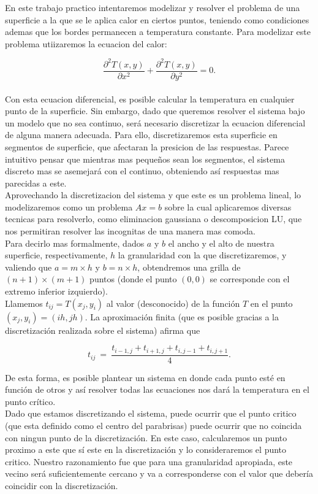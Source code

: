 En este trabajo practico intentaremos modelizar y resolver el problema de una superficie a la que se le aplica calor en ciertos puntos, teniendo como condiciones ademas que los bordes permanecen a temperatura constante. Para modelizar este problema utiizaremos la ecuacion del calor:

\begin{equation}
\frac{\partial^2T(x,y)}{\partial x^{2}}+\frac{\partial^2 T(x,y)}{\partial y^{2}} = 0.
\end{equation}\\

Con esta ecuacion diferencial, es posible calcular la temperatura en cualquier punto de la superficie. Sin embargo, dado que queremos resolver el sistema bajo un modelo que no sea continuo, ser\'a necesario discretizar la ecuacion diferencial de alguna manera adecuada. Para ello, discretizaremos esta superficie en segmentos de superficie, que afectaran la presicion de las respuestas. Parece intuitivo pensar que mientras mas pequeños sean los segmentos, el sistema discreto mas se asemejar\'a con el continuo, obteniendo as\'i respuestas mas parecidas a este.
\\
Aprovechando la discretizacion del sistema y que este es un problema lineal, lo modelizaremos como un problema $Ax=b$ sobre la cual aplicaremos diversas tecnicas para resolverlo, como eliminacion gaussiana o descomposicion LU, que nos permitiran resolver las incognitas de una manera mas comoda.
\\
Para decirlo mas formalmente, dados $a$ y $b$ el ancho y el alto de nuestra superficie, respectivamente, $h$ la granularidad con la que discretizaremos, y valiendo que  $a = m\times h$ y $b = n \times h$, obtendremos una grilla de $(n+1)\times(m+1)$ puntos (donde el punto $(0,0)$ se corresponde con el extremo inferior izquierdo).
\\
Llamemos $t_{ij} = T(x_j,y_i)$ al valor (desconocido) de la funci\'on $T$ en el punto $(x_j, y_i) = (ih, jh)$. La aproximaci\'on finita (que es posible gracias a la discretizaci\'on realizada sobre el sistema) afirma que

\begin{equation}
t_{ij} \ =\ \frac{ t_{i-1,j} + t_{i+1,j} + t_{i,j-1} + t_{i,j+1}}{4}.
\end{equation}

De esta forma, es posible plantear un sistema en donde cada punto est\'e en funci\'on de otros y as\'i resolver todas las ecuaciones nos dar\'a la temperatura en el punto cr\'itico.
\\
Dado que estamos discretizando el sistema, puede ocurrir que el punto critico (que esta definido como el centro del parabrisas) puede ocurrir que no coincida con ningun punto de la discretización. En este caso, calcularemos un punto proximo a este que sí este en la discretización y lo consideraremos el punto critico. Nuestro razonamiento fue que para una granularidad apropiada, este vecino será suficientemente cercano y va a corresponderse con el valor que debería coincidir con la discretización.

